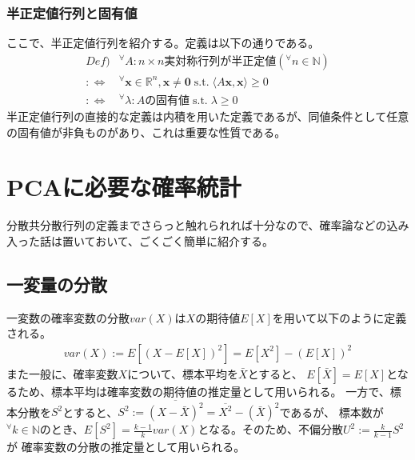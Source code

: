 \documentclass[10pt]{ujarticle}
\begin{document}
\subsubsection{半正定値行列と固有値}
ここで、半正定値行列を紹介する。定義は以下の通りである。
$$
\begin{aligned}
  Def)&^\forall A:n\times n\text{実対称行列が半正定値}(^\forall n\in\mathbb{N})\\
  :\Leftrightarrow&^\forall \mathbf{x}\in\mathbb{R}^n,\mathbf{x}\neq\mathbf{0}\;\text{s.t.}\; \langle A\mathbf{x},\mathbf{x}\rangle\geq0\\
  :\Leftrightarrow&^\forall\lambda:A\text{の固有値}\;\text{s.t.}\;\lambda\geq 0
\end{aligned}
$$
半正定値行列の直接的な定義は内積を用いた定義であるが、同値条件として任意の固有値が非負ものがあり、これは重要な性質である。

\section{PCAに必要な確率統計}
分散共分散行列の定義までさらっと触れられれば十分なので、確率論などの込み入った話は置いておいて、ごくごく簡単に紹介する。

\subsection{一変量の分散}
一変数の確率変数の分散$var(X)$は$X$の期待値$E[X]$を用いて以下のように定義される。
$$
\begin{aligned}
  var(X):=E[(X-E[X])^2]=E[X^2]-(E[X])^2
\end{aligned}
$$
また一般に、確率変数$X$について、標本平均を$\bar{X}$とすると、
$E[\bar{X}]=E[X]$となるため、標本平均は確率変数の期待値の推定量として用いられる。
一方で、標本分散を$S^2$とすると、$S^2:=\overline{(X-\bar{X})^2}=\overline{X^2}-(\bar{X})^2$であるが、
標本数が$^\forall k\in\mathbb{N}$のとき、$E[S^2]=\frac{k-1}{k}var(X)$となる。そのため、不偏分散$U^2:=\frac{k}{k-1}S^2$が
確率変数の分散の推定量として用いられる。
\end{document}
